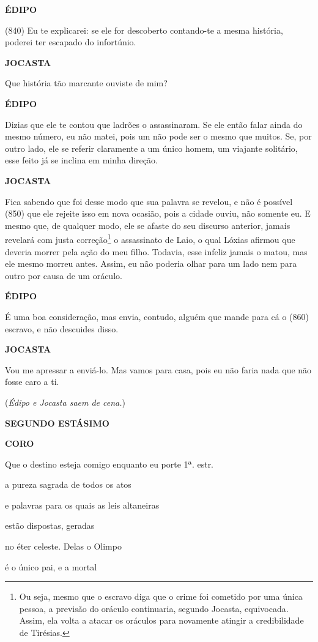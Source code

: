 \textbf{ÉDIPO}

(840) Eu te explicarei: se ele for descoberto contando-te a mesma
história, poderei ter escapado do infortúnio.

\textbf{JOCASTA}

Que história tão marcante ouviste de mim?

\textbf{ÉDIPO}

Dizias que ele te contou que ladrões o assassinaram. Se ele então falar
ainda do mesmo número, eu não matei, pois um não pode ser o mesmo que
muitos. Se, por outro lado, ele se referir claramente a um único homem,
um viajante solitário, esse feito já se inclina em minha direção.

\textbf{JOCASTA}

Fica sabendo que foi desse modo que sua palavra se revelou, e não é
possível (850) que ele rejeite isso em nova ocasião, pois a cidade
ouviu, não somente eu. E mesmo que, de qualquer modo, ele se afaste do
seu discurso anterior, jamais revelará com justa correção\footnote{Ou
  seja, mesmo que o escravo diga que o crime foi cometido por uma única
  pessoa, a previsão do oráculo continuaria, segundo Jocasta,
  equivocada. Assim, ela volta a atacar os oráculos para novamente
  atingir a credibilidade de Tirésias.} o assassinato de Laio, o qual
Lóxias afirmou que deveria morrer pela ação do meu filho. Todavia, esse
infeliz jamais o matou, mas ele mesmo morreu antes. Assim, eu não
poderia olhar para um lado nem para outro por causa de um oráculo.

\textbf{ÉDIPO}

É uma boa consideração, mas envia, contudo, alguém que mande para cá o
(860) escravo, e não descuides disso.

\textbf{JOCASTA}

Vou me apressar a enviá-lo. Mas vamos para casa, pois eu não faria nada
que não fosse caro a ti.

(\emph{Édipo e Jocasta saem de cena.})

\textbf{SEGUNDO ESTÁSIMO}

\textbf{CORO}

Que o destino esteja comigo enquanto eu porte 1ª. estr.

a pureza sagrada de todos os atos

e palavras para os quais as leis altaneiras

estão dispostas, geradas

no éter celeste. Delas o Olimpo

é o único pai, e a mortal

